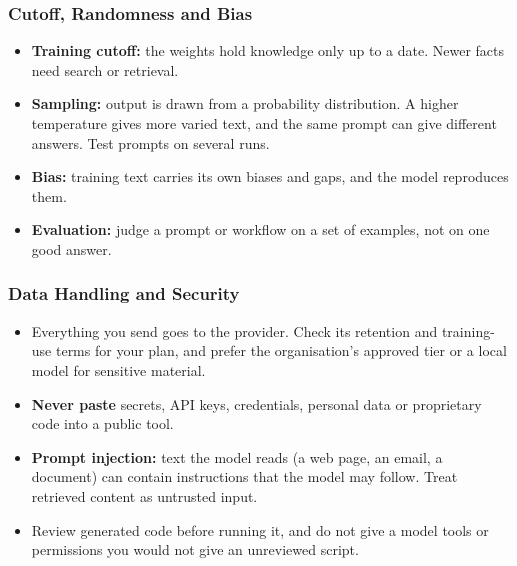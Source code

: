 \begin{frame}[fragile]\frametitle{Cutoff, Randomness and Bias}
\begin{itemize}
\item \textbf{Training cutoff:} the weights hold knowledge only up to a date. Newer facts need search or retrieval.
\item \textbf{Sampling:} output is drawn from a probability distribution. A higher temperature gives more varied text, and the same prompt can give different answers. Test prompts on several runs.
\item \textbf{Bias:} training text carries its own biases and gaps, and the model reproduces them.
\item \textbf{Evaluation:} judge a prompt or workflow on a set of examples, not on one good answer.
\end{itemize}
\end{frame}

\begin{frame}[fragile]\frametitle{Data Handling and Security}
\begin{itemize}
\item Everything you send goes to the provider. Check its retention and training-use terms for your plan, and prefer the organisation's approved tier or a local model for sensitive material.
\item \textbf{Never paste} secrets, API keys, credentials, personal data or proprietary code into a public tool.
\item \textbf{Prompt injection:} text the model reads (a web page, an email, a document) can contain instructions that the model may follow. Treat retrieved content as untrusted input.
\item Review generated code before running it, and do not give a model tools or permissions you would not give an unreviewed script.
\end{itemize}
\end{frame}
